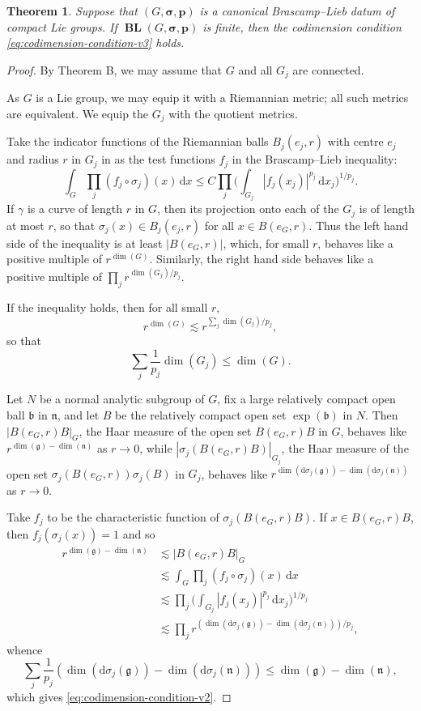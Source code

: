 \documentclass[12pt,twoside,a4paper]{amsart}
\newtheorem{thm}{Theorem}[section]
\theoremstyle{definition}
\theoremstyle{remark}
\numberwithin{equation}{section}
\newcommand{\Lie}[1]{\mathfrak{#1}}
\newcommand{\wrt}[1]{\,\mathrm{d} #1}
\newcommand{\BL}{\operatorname{\mathbf{BL}}}
\newcommand{\bss}{\boldsymbol{\sigma}}
\newcommand{\bsp}{\boldsymbol{p}}
\newcommand{\bigglpar}{\biggl(}
\newcommand{\biggrpar}{\biggr)}
\newcommand{\labs}{\left\vert}
\newcommand{\rabs}{\right\vert}
\begin{document}
\begin{thm}\label{thm:BL-implies-codim-cond}
Suppose that  $(G, \bss, \bsp)$ is a canonical Brascamp--Lieb datum of compact Lie groups. 
If $\BL(G, \bss, \bsp)$ is finite, then the codimension condition \eqref{eq:codimension-condition-v3} holds.
\end{thm}

\begin{proof}
By Theorem B, we may assume that $G$ and all $G_j$ are connected.

As $G$ is a Lie group, we may equip it with a Riemannian metric; all such metrics are equivalent.
We equip the $G_j$ with the quotient metrics.

Take the indicator functions of the Riemannian balls $B_j(e_j,r)$ with centre $e_j$ and radius $r$ in $G_j$ in as the test functions $f_j$ in the Brascamp--Lieb inequality:
\begin{equation}\label{eq:BL-ineq-again}
\int_G \prod_j (f_j \circ \sigma_j)(x) \wrt x 
\leq C \prod_j \bigglpar \int_{G_j}  \labs f_j(x_j) \rabs^{p_j} \wrt x_j \biggrpar^{1/p_j} .
\end{equation}
If $\gamma$ is a curve of length $r$ in $G$, then its projection onto each of the $G_j$ is of length at most $r$, so that $\sigma_j(x) \in B_j(e_j, r)$ for all $x \in B(e_G, r)$.
Thus the left hand side of the inequality is at least $| B(e_G, r) |$, which, for small $r$, behaves like a positive multiple of $r^{\dim(G)}$.
Similarly, the right hand side behaves like a positive multiple of $\prod_j r^{\dim(G_j)/p_j}$.

If the inequality holds, then for all small $r$,
\[
r^{\dim(G)} \lesssim  r^{\sum_j \dim(G_j)/p_j},
\]
so that
\[
\sum_j \frac{1}{p_j} \dim(G_j) \leq \dim(G) .
\]

Let $N$ be a normal analytic subgroup of $G$, fix a large relatively compact open ball $\Lie{b}$ in $\Lie{n}$, and let $B$ be the relatively compact open set $\exp(\Lie{b})$ in $N$.
Then $|B(e_G,r) B|_G$, the Haar measure of the open set $B(e_G, r) B$ in $G$, behaves like $r^{\dim(\Lie{g}) - \dim(\Lie{n})}$ as $r \to 0$, while $|\sigma_j(B(e_G,r) B)|_{G_j}$, the Haar measure of the open set $\sigma_j(B(e_G, r)) \sigma_j(B)$ in $G_j$, behaves like $r^{\dim(\mathrm{d}\sigma_j(\Lie{g})) - \dim(\mathrm{d}\sigma_j(\Lie{n}))}$ as $r \to 0$.

Take $f_j$ to be the characteristic function of $\sigma_j(B(e_G,r) B)$.
If $x \in B(e_G,r) B$, then $f_j(\sigma_j(x)) = 1$ and so
\[
\begin{aligned}
r^{\dim(\Lie{g}) - \dim(\Lie{n})}
&\lesssim |B(e_G,r) B|_G \\
&\lesssim \int_G \prod_j (f_j \circ \sigma_j)(x) \wrt x \\
&\lesssim  \prod_j \bigglpar \int_{G_j}  \labs f_j(x_j) \rabs^{p_j} \wrt x_j \biggrpar^{1/p_j} \\
&\lesssim \prod_j r^{ (\dim(\mathrm{d}\sigma_j(\Lie{g})) - \dim(\mathrm{d}\sigma_j(\Lie{n}))) /p_j} ,
\end{aligned}
\] 
whence
\[
\sum_j \frac{1}{p_j} (\dim(\mathrm{d}\sigma_j(\Lie{g})) - \dim(\mathrm{d}\sigma_j(\Lie{n}) )) 
\leq \dim(\Lie{g}) - \dim(\Lie{n})   ,
\]
which gives \eqref{eq:codimension-condition-v2}.
\end{proof}
\end{document}
